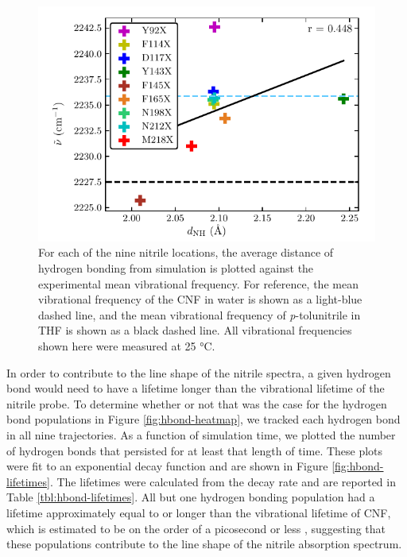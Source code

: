 \begin{figure}
    \center
    \includegraphics[width=\single]{figures-gfp-hbond/abs_max_vs_max_dist.pdf}
    \caption{
        For each of the nine nitrile locations, the average distance of hydrogen bonding from simulation is plotted against the experimental mean vibrational frequency. 
        For reference, the mean vibrational frequency of the CNF in water is shown as a light-blue dashed line, and the mean vibrational frequency of \emph{p}-tolunitrile in THF is shown as a black dashed line. 
        All vibrational frequencies shown here were measured at 25 \si{\celsius}.
    }
    \label{fig:hbond-abs_vs_dist}
\end{figure}

In order to contribute to the line shape of the nitrile spectra, a given hydrogen bond would need to have a lifetime longer than the vibrational lifetime of the nitrile probe.
To determine whether or not that was the case for the hydrogen bond populations in Figure \ref{fig:hbond-heatmap}, we tracked each hydrogen bond in all nine trajectories.
As a function of simulation time, we plotted the number of hydrogen bonds that persisted for at least that length of time.
These plots were fit to an exponential decay function and are shown in Figure \ref{fig:hbond-lifetimes}.
The lifetimes were calculated from the decay rate and are reported in Table \ref{tbl:hbond-lifetimes}.
All but one hydrogen bonding population had a lifetime approximately equal to or longer than the vibrational lifetime of CNF, which is estimated to be on the order of a picosecond or less \cite{Ghosh2009, Ha2009, Waegele2010}, suggesting that these populations contribute to the line shape of the nitrile absorption spectrum.

